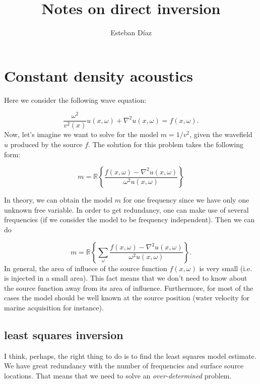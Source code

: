 \documentclass[10pt]{article}
\author{Esteban D\'{i}az}
\title{Notes on direct inversion}{}
\begin{document}
\maketitle


\section{Constant density acoustics}

Here we consider the following wave equation:

\begin{equation}
  \frac{\omega^2 }{v^2(x)} u(x,\omega) +\nabla^2 u(x,\omega) = f(x,\omega).
  \label{eq:cden}
\end{equation}
 Now, let's imagine we want to solve for the model $m = 1/v^2$, given the wavefield $u$ produced
by the source $f$. The solution for this problem takes the following form:

\begin{equation}
   m = \mathbb{R}\left\{ \frac {{f(x,\omega)} - \nabla^2{ u(x,\omega) }}{\omega^2 u(x,\omega)} \right\}
\end{equation}

In theory, we can obtain the model $m$ for one frequency since we have only one unknown free variable.
In order to get redundancy, one can make use of several frequencies (if we consider the model
to be frequency independent). Then we can do

\begin{equation}
   m =  \mathbb{R}\left\{\sum_\omega \frac {{f(x,\omega)} - \nabla^2{ u(x,\omega) }}{\omega^2 u(x,\omega)} \right\}.
\end{equation}
In general, the area of influece of the source function $f(x,\omega)$ is very small (i.e. is injected in a small area). 
 This fact means that we don't need to know about the source function away from its area of influence. Furthermore,
 for most of the cases the model  should be well known at the source position (water velocity for marine acquisition for instance). 

\subsection{least squares inversion}

I think, perhaps, the right thing to do is to find the least squares 
model estimate. We have great redundancy with the number of frequencies
and surface source locations. That means that we need to solve an 
\emph{over-determined}  problem.
\end{document}
